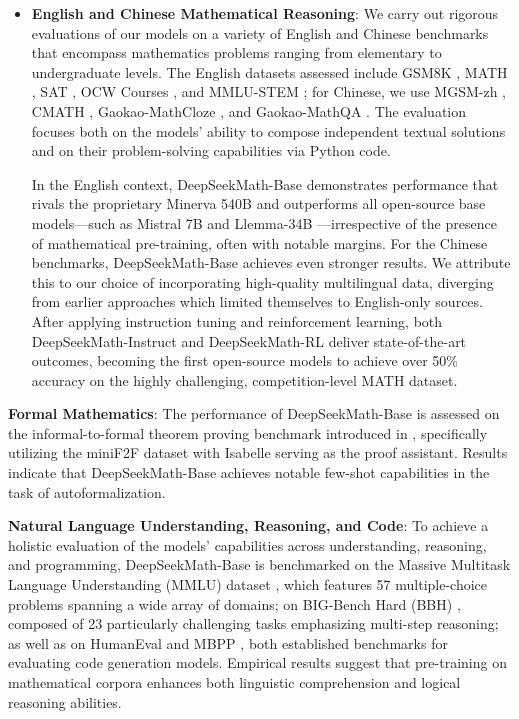 \begin{itemize}[topsep=0pt]
    \item \textbf{English and Chinese Mathematical Reasoning}: We carry out rigorous evaluations of our models on a variety of English and Chinese benchmarks that encompass mathematics problems ranging from elementary to undergraduate levels. The English datasets assessed include GSM8K \citep{gsm8k}, MATH \citep{MATH}, SAT \citep{llemma}, OCW Courses \citep{minerva}, and MMLU-STEM \citep{mmlu}; for Chinese, we use MGSM-zh \citep{mgsm}, CMATH \citep{wei2023cmath}, Gaokao-MathCloze \citep{agieval}, and Gaokao-MathQA \citep{agieval}. The evaluation focuses both on the models’ ability to compose independent textual solutions and on their problem-solving capabilities via Python code.

    In the English context, DeepSeekMath-Base demonstrates performance that rivals the proprietary Minerva 540B \citep{minerva} and outperforms all open-source base models—such as Mistral 7B \citep{mistral} and Llemma-34B \citep{llemma}—irrespective of the presence of mathematical pre-training, often with notable margins. For the Chinese benchmarks, DeepSeekMath-Base achieves even stronger results. We attribute this to our choice of incorporating high-quality multilingual data, diverging from earlier approaches \citep{minerva, llemma} which limited themselves to English-only sources. After applying instruction tuning and reinforcement learning, both DeepSeekMath-Instruct and DeepSeekMath-RL deliver state-of-the-art outcomes, becoming the first open-source models to achieve over 50\% accuracy on the highly challenging, competition-level MATH dataset.
\end{itemize}

\item \textbf{Formal Mathematics}: The performance of DeepSeekMath-Base is assessed on the informal-to-formal theorem proving benchmark introduced in \citep{dsp_proof}, specifically utilizing the miniF2F dataset \citep{minif2f} with Isabelle \citep{isabelle} serving as the proof assistant. Results indicate that DeepSeekMath-Base achieves notable few-shot capabilities in the task of autoformalization.

\item \textbf{Natural Language Understanding, Reasoning, and Code}: To achieve a holistic evaluation of the models' capabilities across understanding, reasoning, and programming, DeepSeekMath-Base is benchmarked on the Massive Multitask Language Understanding (MMLU) dataset \citep{mmlu}, which features 57 multiple-choice problems spanning a wide array of domains; on BIG-Bench Hard (BBH) \citep{bbh}, composed of 23 particularly challenging tasks emphasizing multi-step reasoning; as well as on HumanEval \citep{codex} and MBPP \citep{mbpp}, both established benchmarks for evaluating code generation models. Empirical results suggest that pre-training on mathematical corpora enhances both linguistic comprehension and logical reasoning abilities.

